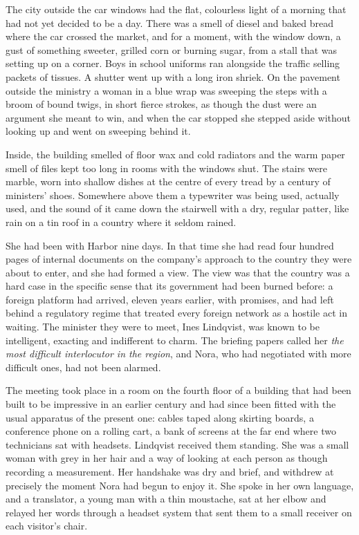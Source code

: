 The city outside the car windows had the flat, colourless light of a morning that had not yet decided to be a day. There was a smell of diesel and baked bread where the car crossed the market, and for a moment, with the window down, a gust of something sweeter, grilled corn or burning sugar, from a stall that was setting up on a corner. Boys in school uniforms ran alongside the traffic selling packets of tissues. A shutter went up with a long iron shriek. On the pavement outside the ministry a woman in a blue wrap was sweeping the steps with a broom of bound twigs, in short fierce strokes, as though the dust were an argument she meant to win, and when the car stopped she stepped aside without looking up and went on sweeping behind it.

Inside, the building smelled of floor wax and cold radiators and the warm paper smell of files kept too long in rooms with the windows shut. The stairs were marble, worn into shallow dishes at the centre of every tread by a century of ministers' shoes. Somewhere above them a typewriter was being used, actually used, and the sound of it came down the stairwell with a dry, regular patter, like rain on a tin roof in a country where it seldom rained.

She had been with Harbor nine days. In that time she had read four hundred pages of internal documents on the company's approach to the country they were about to enter, and she had formed a view. The view was that the country was a hard case in the specific sense that its government had been burned before: a foreign platform had arrived, eleven years earlier, with promises, and had left behind a regulatory regime that treated every foreign network as a hostile act in waiting. The minister they were to meet, Ines Lindqvist, was known to be intelligent, exacting and indifferent to charm. The briefing papers called her \emph{the most difficult interlocutor in the region}, and Nora, who had negotiated with more difficult ones, had not been alarmed.

The meeting took place in a room on the fourth floor of a building that had been built to be impressive in an earlier century and had since been fitted with the usual apparatus of the present one: cables taped along skirting boards, a conference phone on a rolling cart, a bank of screens at the far end where two technicians sat with headsets. Lindqvist received them standing. She was a small woman with grey in her hair and a way of looking at each person as though recording a measurement. Her handshake was dry and brief, and withdrew at precisely the moment Nora had begun to enjoy it. She spoke in her own language, and a translator, a young man with a thin moustache, sat at her elbow and relayed her words through a headset system that sent them to a small receiver on each visitor's chair.

